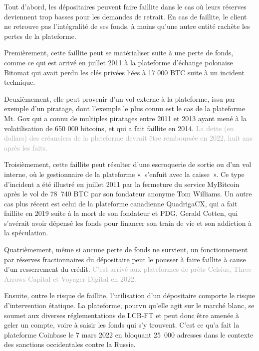 Tout d'abord, les dépositaires peuvent faire faillite dans le cas où leurs réserves deviennent trop basses pour les demandes de retrait. En cas de faillite, le client ne retrouve pas l'intégralité de ses fonds, à moins qu'une autre entité rachète les pertes de la plateforme.

Premièrement, cette faillite peut se matérialiser suite à une perte de fonds, comme ce qui est arrivé en juillet 2011 à la plateforme d'échange polonaise Bitomat qui avait perdu les clés privées liées à 17 000 BTC suite à un incident technique.

Deuxièmement, elle peut provenir d'un vol externe à la plateforme, issu par exemple d'un piratage, dont l'exemple le plus connu est le cas de la plateforme Mt. Gox qui a connu de multiples piratages entre 2011 et 2013 ayant mené à la volatilisation de 650 000 bitcoins, et qui a fait faillite en 2014. \textcolor{darkgray}{La dette (en dollars) des créanciers de la plateforme devrait être remboursée en 2022, huit ans après les faits.}

Troisièmement, cette faillite peut résulter d'une escroquerie de sortie ou d'un vol interne, où le gestionnaire de la plateforme «~s'enfuit avec la caisse~». Ce type d'incident a été illustré en juillet 2011 par la fermeture du service MyBitcoin après le vol de 78~740 BTC par son fondateur anonyme Tom Williams. Un autre cas plus récent est celui de la plateforme canadienne QuadrigaCX, qui a fait faillite en 2019 suite à la mort de son fondateur et PDG, Gerald Cotten, qui s'avérait avoir dépensé les fonds pour financer son train de vie et son addiction à la spéculation.

Quatrièmement, même si aucune perte de fonds ne survient, un fonctionnement par réserves fractionnaires du dépositaire peut le pousser à faire faillite à cause d'un resserrement du crédit. \textcolor{darkgray}{C'est arrivé aux plateformes de prêts Celsius, Three Arrows Capital et Voyager Digital en 2022.}

Ensuite, outre le risque de faillite, l'utilisation d'un dépositaire comporte le risque d'intervention étatique. La plateforme, pourvu qu'elle agit sur le marché blanc, se soumet aux diverses réglementations de LCB-FT et peut donc être amenée à geler un compte, voire à saisir les fonds qui s'y trouvent. C'est ce qu'a fait la plateforme Coinbase le 7 mars 2022 en bloquant 25~000 adresses dans le contexte des sanctions occidentales contre la Russie.

